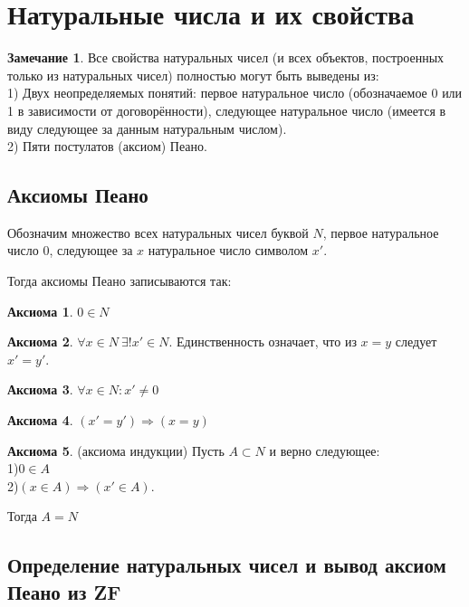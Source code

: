 \documentclass[12pt,oneside]{article}
\theoremstyle{definition}
\newtheorem{axiom}{Аксиома}[section]
\newtheorem{remark}{Замечание}[section]
\begin{document}
\section{Натуральные числа и их свойства}
\begin{remark}
Все свойства натуральных чисел (и всех объектов, построенных только из натуральных чисел) полностью могут быть выведены из:
\\1) Двух неопределяемых понятий: первое натуральное число (обозначаемое 0 или 1 в зависимости от договорённости), следующее натуральное число (имеется в виду следующее за данным натуральным числом).
\\2) Пяти постулатов (аксиом) Пеано.
\end{remark}

\subsection{Аксиомы Пеано}

Обозначим множество всех натуральных чисел буквой $N$, первое натуральное число $0$, следующее за $x$ натуральное число символом $x'$. 

Тогда аксиомы Пеано записываются так: 

\begin{axiom}
$0\in N$
\end{axiom}

\begin{axiom}
$\forall x\in N\ \exists ! x'\in N$. Единственность означает, что из $x=y$ следует $x'=y'$.
\end{axiom}

\begin{axiom}
$\forall x\in N: x'\neq 0$
\end{axiom}

\begin{axiom}
$(x' = y') \Longrightarrow (x=y)$
\end{axiom}

\begin{axiom}
(аксиома индукции) Пусть $A\subset N$ и верно следующее:
\\1)$0\in A$
\\2)$(x\in A)\Longrightarrow (x'\in A)$.

Тогда $A=N$
\end{axiom}


\subsection{Определение натуральных чисел и вывод аксиом Пеано из ZF}
\end{document}
